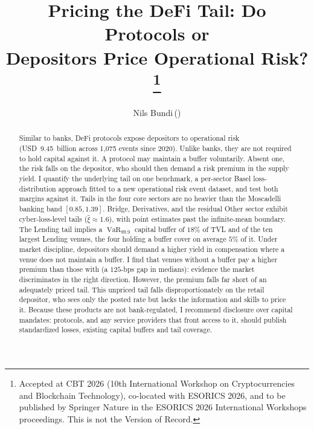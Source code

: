 \documentclass[runningheads]{llncs}
\newcommand{\VaR}{\operatorname{VaR}}
\begin{document}
\title{Pricing the DeFi Tail: Do Protocols or\\
Depositors Price Operational Risk?\thanks{Accepted at CBT 2026
(10th International Workshop on Cryptocurrencies and Blockchain
Technology), co-located with ESORICS 2026, and to be published by
Springer Nature in the ESORICS 2026 International Workshops
proceedings. This is not the Version of Record.}}
\author{Nils Bundi\,(\Envelope)}
\maketitle

\begin{abstract}
Similar to banks, DeFi protocols expose depositors to operational risk
(USD~9.45~billion across 1{,}075 events since 2020). Unlike banks, they
are not required to hold capital against it. A protocol may maintain a
buffer voluntarily. Absent one, the risk falls on the depositor, who
should then demand a risk premium in the supply yield. I quantify the underlying tail on one
benchmark, a per-sector Basel loss-distribution approach fitted to a
new operational risk event dataset, and test both margins against it. Tails
in the four core sectors are no heavier than the Moscadelli banking band
$[0.85, 1.39]$. Bridge, Derivatives, and the residual Other sector exhibit
cyber-loss-level tails ($\hat\xi \approx 1.6$), with point estimates past
the infinite-mean boundary. The Lending tail implies a $\VaR_{99.9}$ capital buffer of
$18\%$ of TVL and of the ten largest Lending venues,
the four holding a buffer cover on average $5\%$ of it.
Under market discipline, depositors should demand a higher yield in compensation where
a venue does not maintain a buffer. I find that venues without a buffer pay a higher premium than those with (a $125$-bps gap in medians): evidence the market discriminates in the right direction. However, the premium falls far short of an adequately priced tail. This unpriced tail falls disproportionately on the retail
depositor, who sees only the posted rate but lacks the information and skills 
to price it. Because these products are not bank-regulated, I recommend 
disclosure over capital mandates: protocols, and any service
providers that front access to it, should publish standardized
losses, existing capital buffers and tail coverage.
\end{abstract}
\end{document}
